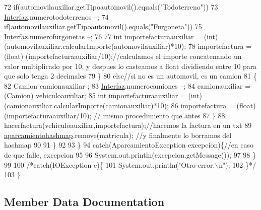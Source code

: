 \begin{DoxyCode}
72             \textcolor{keywordflow}{if}(automovilauxiliar.getTipoautomovil().equals(\textcolor{stringliteral}{"Todoterreno"}))
73                 \mbox{\hyperlink{namespace_interfaz}{Interfaz}}.numerotodoterrenos --;
74             \textcolor{keywordflow}{if}(automovilauxiliar.getTipoautomovil().equals(\textcolor{stringliteral}{"Furgoneta"}))
75                 \mbox{\hyperlink{namespace_interfaz}{Interfaz}}.numerofurgonetas --;
76             
77             \textcolor{keywordtype}{int} importefacturaauxiliar = (\textcolor{keywordtype}{int}) (automovilauxiliar.calcularImporte(automovilauxiliar)*10);
78                 importefactura = (float) (importefacturaauxiliar/10);\textcolor{comment}{//calculamos el importe concatenando
       un valor multiplicado por 10, y despues lo casteamos a float dividiendo entre 10 para que solo tenga 2
       decimales}
79             \}
80             \textcolor{keywordflow}{else}\textcolor{comment}{//si no es un automovil, es un camion}
81             \{
82                 Camion camionauxiliar ;
83                 \mbox{\hyperlink{namespace_interfaz}{Interfaz}}.numerocamiones --;
84                 camionauxiliar = (Camion) vehiculoauxiliar;
85                 \textcolor{keywordtype}{int} importefacturaauxiliar = (int) (camionauxiliar.calcularImporte(camionauxiliar)*10);
86                 importefactura = (float) (importefacturaauxiliar/10);                                   \textcolor{comment}{//
      mismo procedimiento que antes}
87             \}
88             hacerfactura(vehiculoauxiliar,importefactura);\textcolor{comment}{//hacemos la factura en un txt}
89             \mbox{\hyperlink{classejercicio2_1_1_ejercicio2_aa5edc1e53d504e830b43940e31c3f33a}{aparcamientohashmap}}.remove(matricula);          \textcolor{comment}{//y finalmente lo borramos
       del hashmap}
90 
91             \}
92             
93         \}
94         \textcolor{keywordflow}{catch}(AparcamientoException excepcion)\{\textcolor{comment}{//en caso de que falle, excepcion}
95             
96             System.out.println(excepcion.getMessage());
97                 
98         \}
99         
100             \textcolor{comment}{/*catch(IOException e)\{}
101 \textcolor{comment}{                System.out.println("Otro error.\(\backslash\)n");}
102 \textcolor{comment}{            \}*/}
103     \}
\end{DoxyCode}


\subsection{Member Data Documentation}
\mbox{\label{classejercicio2_1_1_ejercicio2_aa5edc1e53d504e830b43940e31c3f33a}} 
